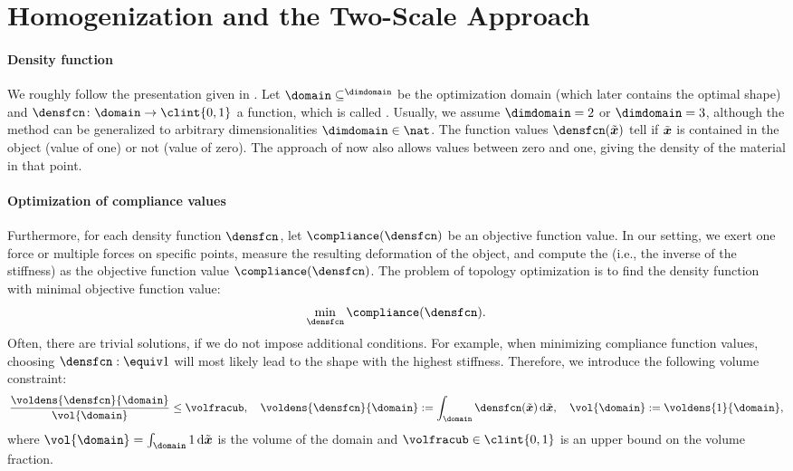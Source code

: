 \section{Homogenization and the Two-Scale Approach}
\label{sec:61homogenization}

\paragraph{Density function}

We roughly follow the presentation given in
.
Let $\domain \subset \real^{\dimdomain}$ be the optimization domain
(which later contains the optimal shape) and
$\densfcn\colon \domain \to \clint{0, 1}$ a function,
which is called .
Usually, we assume $\dimdomain = 2$ or $\dimdomain = 3$,
although the method can be generalized to
arbitrary dimensionalities $\dimdomain \in \nat$.
The function values $\densfcn(\tilde{\*x})$ tell if $\tilde{{\boldsymbol{x}}}$
is contained in the object (value of one) or not (value of zero).
The approach of  now also allows values between
zero and one, giving the density of the material in that point.

\paragraph{Optimization of compliance values}

Furthermore, for each density function $\densfcn$,
let $\compliance(\densfcn)$ be an objective function value.
In our setting,
we exert one force or multiple forces on specific points,
measure the resulting deformation of the object, and
compute the  (i.e., the inverse of the stiffness) as
the objective function value $\compliance(\densfcn)$.
The problem of topology optimization is to find the density function
with minimal objective function value:
\begin{equation}
  \label{eq:topoOptProblemContinuous}
  \min_{\densfcn} \compliance(\densfcn).
\end{equation}
Often, there are trivial solutions, if we do not impose additional conditions.
For example, when minimizing compliance function values,
choosing $\densfcn :\equiv 1$ will most likely lead to the shape with the
highest stiffness.
Therefore, we introduce the following volume constraint:
\begin{equation}
  \frac{\voldens{\densfcn}{\domain}}{\vol{\domain}} \le \volfracub,\quad
  \voldens{\densfcn}{\domain}
  := \int_{\domain} \densfcn(\tilde{\*x}) \diff\tilde{\*x},\quad
  \vol{\domain}
  := \voldens{1}{\domain},
\end{equation}
where $\vol{\domain} = \int_{\domain} 1 \diff\tilde{\*x}$
is the volume of the domain and
$\volfracub \in \clint{0, 1}$ is an upper bound on the volume fraction.

